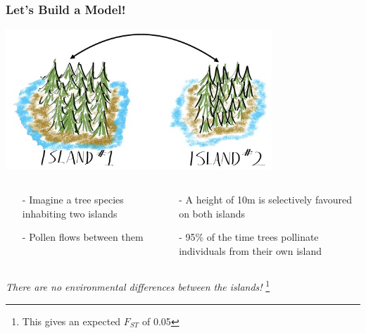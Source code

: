 \documentclass[xcolor=dvipsnames]{beamer}
\newcommand\blfootnote[1]{%
	\begingroup
	\renewcommand\thefootnote{}\footnote{#1}%
	\addtocounter{footnote}{-1}%
	\endgroup
}
\begin{document}
\begin{frame}
\frametitle{Let's Build a Model!}
\centering	\includegraphics[keepaspectratio, width  = 0.75\textwidth]{img/treeIslands}
\begin{columns}
	\begin{column}{0.4\textwidth}
	\begin{itemize}
	\item[-] Imagine a tree species inhabiting two islands
	\item[-] Pollen flows between them 


\end{itemize}

		\end{column}
	\begin{column}{0.6\textwidth}
		\begin{itemize}
				\item[-] A height of 10m is selectively favoured on both islands
	\item[-] 95\% of the time trees pollinate individuals from their own island
			\end{itemize}
	\end{column}
\end{columns}
\vspace{15pt}
\textit{There are no environmental differences between the islands!}
\blfootnote{This gives an expected $F_{ST}$ of 0.05}
\end{frame}
\end{document}
